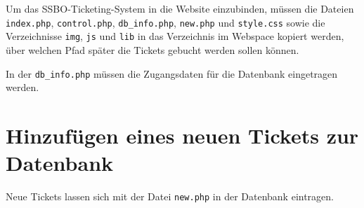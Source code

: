 \documentclass[12pt,a4paper,final,twoside,onecolumn,titlepage]{article}
\begin{document}
Um das SSBO-Ticketing-System in die Website einzubinden, müssen die Dateien \texttt{index.php}, \texttt{control.php}, \texttt{db\_info.php}, \texttt{new.php} und \texttt{style.css} sowie die Verzeichnisse \texttt{img}, \texttt{js} und \texttt{lib} in das Verzeichnis im Webspace kopiert werden, über welchen Pfad später die Tickets gebucht werden sollen können.

In der \texttt{db\_info.php} müssen die Zugangsdaten für die Datenbank eingetragen werden.

\section{Hinzufügen eines neuen Tickets zur Datenbank}

Neue Tickets lassen sich mit der Datei \texttt{new.php} in der Datenbank eintragen.
\end{document}
